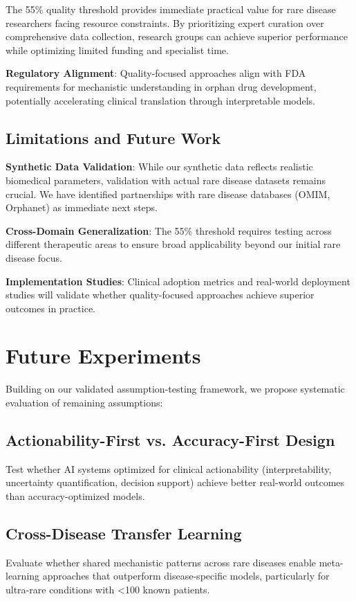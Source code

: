 \documentclass{article}
\begin{document}
The 55\% quality threshold provides immediate practical value for rare disease researchers facing resource constraints. By prioritizing expert curation over comprehensive data collection, research groups can achieve superior performance while optimizing limited funding and specialist time.

\textbf{Regulatory Alignment}: Quality-focused approaches align with FDA requirements for mechanistic understanding in orphan drug development, potentially accelerating clinical translation through interpretable models.

\subsection{Limitations and Future Work}

\textbf{Synthetic Data Validation}: While our synthetic data reflects realistic biomedical parameters, validation with actual rare disease datasets remains crucial. We have identified partnerships with rare disease databases (OMIM, Orphanet) as immediate next steps.

\textbf{Cross-Domain Generalization}: The 55\% threshold requires testing across different therapeutic areas to ensure broad applicability beyond our initial rare disease focus.

\textbf{Implementation Studies}: Clinical adoption metrics and real-world deployment studies will validate whether quality-focused approaches achieve superior outcomes in practice.

\section{Future Experiments}

Building on our validated assumption-testing framework, we propose systematic evaluation of remaining assumptions:

\subsection{Actionability-First vs. Accuracy-First Design}
Test whether AI systems optimized for clinical actionability (interpretability, uncertainty quantification, decision support) achieve better real-world outcomes than accuracy-optimized models.

\subsection{Cross-Disease Transfer Learning}
Evaluate whether shared mechanistic patterns across rare diseases enable meta-learning approaches that outperform disease-specific models, particularly for ultra-rare conditions with <100 known patients.
\end{document}

